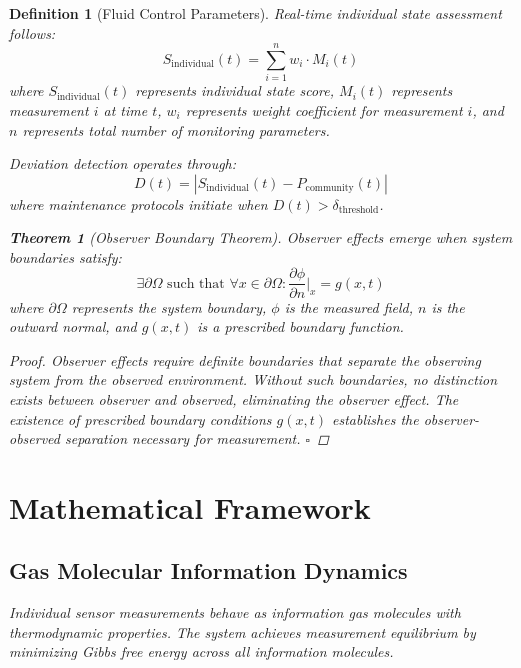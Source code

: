\documentclass[12pt,a4paper]{article}
\newtheorem{theorem}{Theorem}
\newtheorem{definition}{Definition}
\begin{document}
\begin{definition}[Fluid Control Parameters]
Real-time individual state assessment follows:
\begin{equation}
S_{\text{individual}}(t) = \sum_{i=1}^{n} w_i \cdot M_i(t)
\end{equation}
where $S_{\text{individual}}(t)$ represents individual state score, $M_i(t)$ represents measurement $i$ at time $t$, $w_i$ represents weight coefficient for measurement $i$, and $n$ represents total number of monitoring parameters.

Deviation detection operates through:
\begin{equation}
D(t) = |S_{\text{individual}}(t) - P_{\text{community}}(t)|
\end{equation}
where maintenance protocols initiate when $D(t) > \delta_{\text{threshold}}$.

\begin{theorem}[Observer Boundary Theorem]
Observer effects emerge when system boundaries satisfy:
\begin{equation}
\exists \partial \Omega \text{ such that } \forall x \in \partial \Omega : \frac{\partial \phi}{\partial n}\bigg|_x = g(x,t)
\end{equation}
where $\partial \Omega$ represents the system boundary, $\phi$ is the measured field, $n$ is the outward normal, and $g(x,t)$ is a prescribed boundary function.
\end{theorem}

\begin{proof}
Observer effects require definite boundaries that separate the observing system from the observed environment. Without such boundaries, no distinction exists between observer and observed, eliminating the observer effect. The existence of prescribed boundary conditions $g(x,t)$ establishes the observer-observed separation necessary for measurement. $\square$
\end{proof}

\section{Mathematical Framework}

\subsection{Gas Molecular Information Dynamics}

Individual sensor measurements behave as information gas molecules with thermodynamic properties. The system achieves measurement equilibrium by minimizing Gibbs free energy across all information molecules.


\end{definition}
\end{document}
